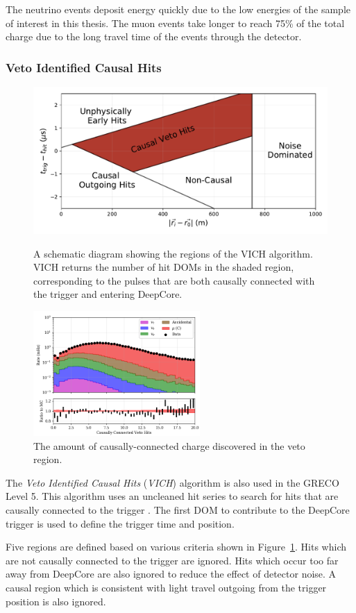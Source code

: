 The neutrino events deposit energy quickly due to the low energies of the sample of interest in this thesis.
The muon events take longer to reach 75\% of the total charge due to the long travel time of the events through the detector.

\subsubsection{Veto Identified Causal Hits}

\begin{figure}[h]
\centering
  \includegraphics[width=0.45\linewidth]{vich_diagram.pdf} \\
\caption{A schematic diagram showing the regions of the VICH algorithm. VICH returns the number of hit DOMs in the shaded region, corresponding to the pulses that are both causally connected with the trigger and entering DeepCore. }
\label{fig:vich_diagram}
\end{figure}

\begin{figure}[h]
	\centering
		\includegraphics[width=2.5in]{Veto_Causal_Hits_(PE)_log.png}
		\caption[Veto Identified Causal Hits]{The amount of causally-connected charge discovered in the veto region.}
	\label{fig:vich}
\end{figure}

The \emph{Veto Identified Causal Hits} (\emph{VICH}) algorithm is also used in the GRECO Level 5.
This algorithm uses an uncleaned hit series to search for hits that are causally connected to the trigger \cite{Thesis-Euler}.
The first DOM to contribute to the DeepCore trigger is used to define the trigger time and position.

Five regions are defined based on various criteria shown in Figure~\ref{fig:vich_diagram}.
Hits which are not causally connected to the trigger are ignored. 
Hits which occur too far away from DeepCore are also ignored to reduce the effect of detector noise.
A causal region which is consistent with light travel outgoing from the trigger position is also ignored.

